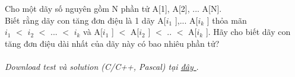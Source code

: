 Cho một dãy số nguyên gồm N phần tử A[1], A[2], ... A[N].   
\\   Biết rằng dãy con tăng đơn điệu là 1 dãy A[$i_{1}$   ],... A[$i_{k}$   ] thỏa mãn   
\\   $i_{1}$   $<$ $i_{2}$   $<$ ... $<$ $i_{k}$   và A[$i_{1}$   ] $<$ A[$i_{2}$   ] $<$ .. $<$ A[$i_{k}$   ]. Hãy cho biết dãy con tăng đơn điệu dài nhất của dãy này có bao nhiêu phần tử?   
\\
\\\textit{    Download test và solution (C/C++, Pascal) tại    \href{https://vn.spoj.pl/content/liq.zip}{     đây    }}   .